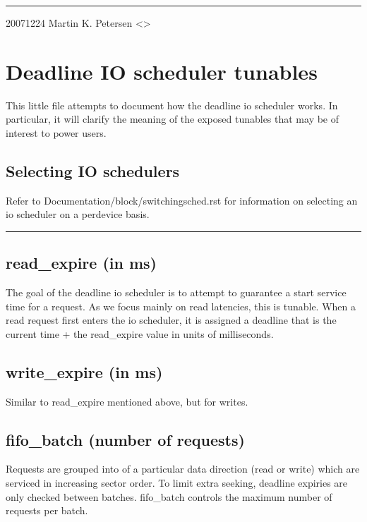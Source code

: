 \documentclass[a4paper,11pt,english]{sphinxmanual}
\begin{document}
\bigskip\hrule\bigskip


2007\sphinxhyphen{}12\sphinxhyphen{}24 Martin K. Petersen \textless{}\textgreater{}


\chapter{Deadline IO scheduler tunables}
\label{\detokenize{deadline-iosched:deadline-io-scheduler-tunables}}\label{\detokenize{deadline-iosched::doc}}
This little file attempts to document how the deadline io scheduler works.
In particular, it will clarify the meaning of the exposed tunables that may be
of interest to power users.


\section{Selecting IO schedulers}
\label{\detokenize{deadline-iosched:selecting-io-schedulers}}
Refer to Documentation/block/switching\sphinxhyphen{}sched.rst for information on
selecting an io scheduler on a per\sphinxhyphen{}device basis.


\bigskip\hrule\bigskip



\section{read\_expire     (in ms)}
\label{\detokenize{deadline-iosched:read-expire-in-ms}}
The goal of the deadline io scheduler is to attempt to guarantee a start
service time for a request. As we focus mainly on read latencies, this is
tunable. When a read request first enters the io scheduler, it is assigned
a deadline that is the current time + the read\_expire value in units of
milliseconds.


\section{write\_expire    (in ms)}
\label{\detokenize{deadline-iosched:write-expire-in-ms}}
Similar to read\_expire mentioned above, but for writes.


\section{fifo\_batch      (number of requests)}
\label{\detokenize{deadline-iosched:fifo-batch-number-of-requests}}
Requests are grouped into  of a particular data direction (read or
write) which are serviced in increasing sector order.  To limit extra seeking,
deadline expiries are only checked between batches.  fifo\_batch controls the
maximum number of requests per batch.
\end{document}

